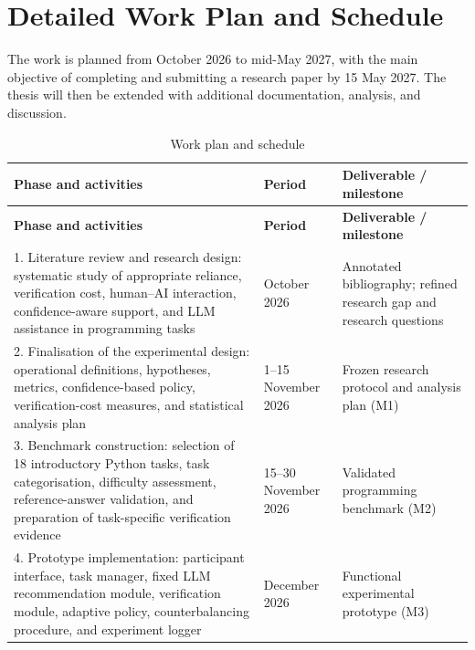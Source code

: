 \documentclass[oneside,final,14pt,a4paper]{extreport}
\theoremstyle{definition}
\theoremstyle{remark}
\begin{document}
\section{Detailed Work Plan and Schedule}
\label{sec:workplan}

The work is planned from October 2026 to mid-May 2027, with the main
objective of completing and submitting a research paper by 15 May 2027.
The thesis will then be extended with additional documentation, analysis,
and discussion.

\begin{longtable}{p{8.0cm}p{2.4cm}p{5.3cm}}
\caption{Work plan and schedule}
\label{tab:workplan} \\
\toprule
\textbf{Phase and activities} & \textbf{Period} &
\textbf{Deliverable / milestone} \\
\midrule
\endfirsthead

\toprule
\textbf{Phase and activities} & \textbf{Period} &
\textbf{Deliverable / milestone} \\
\midrule
\endhead

\bottomrule
\endfoot

1. Literature review and research design:
systematic study of appropriate reliance, verification cost,
human--AI interaction, confidence-aware support, and LLM assistance
in programming tasks &
October 2026 &
Annotated bibliography; refined research gap and research questions \\

2. Finalisation of the experimental design:
operational definitions, hypotheses, metrics, confidence-based policy,
verification-cost measures, and statistical analysis plan &
1--15 November 2026 &
Frozen research protocol and analysis plan (M1) \\

3. Benchmark construction:
selection of 18 introductory Python tasks, task categorisation,
difficulty assessment, reference-answer validation, and preparation
of task-specific verification evidence &
15--30 November 2026 &
Validated programming benchmark (M2) \\

4. Prototype implementation:
participant interface, task manager, fixed LLM recommendation module,
verification module, adaptive policy, counterbalancing procedure,
and experiment logger &
December 2026 &
Functional experimental prototype (M3) \\


\end{longtable}
\end{document}
